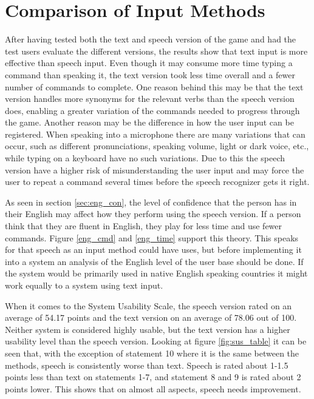 \section{Comparison of Input Methods} %
After having tested both the text and speech version of the game and had the test users evaluate the different versions, the results show that text input is more effective than speech input. Even though it may consume more time typing a command than speaking it, the text version took less time overall and a fewer number of commands to complete. One reason behind this may be that the text version handles more synonyms for the relevant verbs than the speech version does, enabling a greater variation of the commands needed to progress through the game. Another reason may be the difference in how the user input can be registered. When speaking into a microphone there are many variations that can occur, such as different pronunciations, speaking volume, light or dark voice, etc., while typing on a keyboard have no such variations. Due to this the speech version have a higher risk of misunderstanding the user input and may force the user to repeat a command several times before the speech recognizer gets it right. 

As seen in section \ref{sec:eng_con}, the level of confidence that the person has in their English may affect how they perform using the speech version. If a person think that they are fluent in English, they play for less time and use fewer commands. Figure \ref{eng_cmd} and \ref{eng_time} support this theory. This speaks for that speech as an input method could have uses, but before implementing it into a system an analysis of the English level of the user base should be done. If the system would be primarily used in native English speaking countries it might work equally to a system using text input.

When it comes to the System Usability Scale, the speech version rated on an average of 54.17 points and the text version on an average of 78.06 out of 100. Neither system is considered highly usable, but the text version has a higher usability level than the speech version. Looking at figure \ref{fig:sus_table} it can be seen that, with the exception of statement 10 where it is the same between the methods, speech is consistently worse than text. Speech is rated about 1-1.5 points less than text on statements 1-7, and statement 8 and 9 is rated about 2 points lower. This shows that on almost all aspects, speech needs improvement. 

